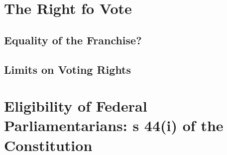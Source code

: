 \section{The Right fo Vote}

\subsection{Equality of the Franchise?}

\subsection{Limits on Voting Rights}

\section{Eligibility of Federal Parliamentarians: s 44(i) of the Constitution}